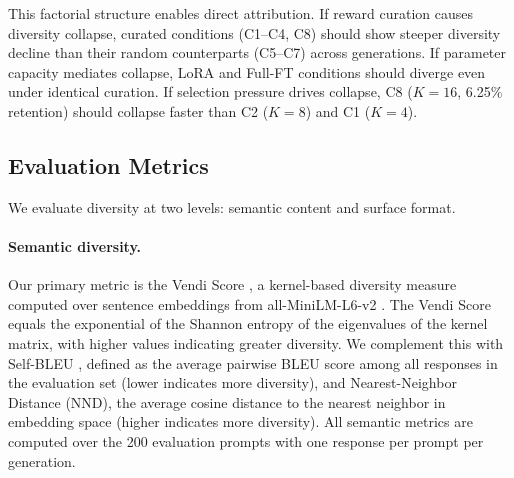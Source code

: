 \begin{table}[t]
\centering
\small
\caption{Experimental configurations. C1--C4 each has a matched random baseline (C5--C7); C8 extends the selection pressure range without a paired baseline. Trainable \% refers to the fraction of model parameters updated during fine-tuning.}
\label{tab:conditions}
\end{table}

This factorial structure enables direct attribution. If reward curation causes diversity collapse, curated conditions (C1--C4, C8) should show steeper diversity decline than their random counterparts (C5--C7) across generations. If parameter capacity mediates collapse, LoRA and Full-FT conditions should diverge even under identical curation. If selection pressure drives collapse, C8 ($K{=}16$, 6.25\% retention) should collapse faster than C2 ($K{=}8$) and C1 ($K{=}4$).

\subsection{Evaluation Metrics}
\label{sec:metrics}

We evaluate diversity at two levels: semantic content and surface format.

\paragraph{Semantic diversity.} Our primary metric is the Vendi Score \cite{placeholder_vendi}, a kernel-based diversity measure computed over sentence embeddings from all-MiniLM-L6-v2 \cite{placeholder_minilm}. The Vendi Score equals the exponential of the Shannon entropy of the eigenvalues of the kernel matrix, with higher values indicating greater diversity. We complement this with Self-BLEU \cite{placeholder_selfbleu}, defined as the average pairwise BLEU score among all responses in the evaluation set (lower indicates more diversity), and Nearest-Neighbor Distance (NND), the average cosine distance to the nearest neighbor in embedding space (higher indicates more diversity). All semantic metrics are computed over the 200 evaluation prompts with one response per prompt per generation.

